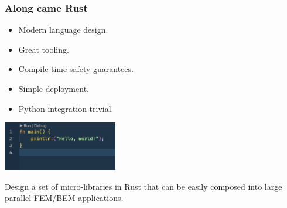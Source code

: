 \documentclass[dvipsnames,10pt]{beamer}
\begin{document}
\begin{frame}
\frametitle{Along came Rust}
\begin{minipage}{5cm}
\begin{itemize}
\item Modern language design.
\item Great tooling.
\item Compile time safety guarantees.
\item Simple deployment.
\item Python integration trivial.
\end{itemize}
\end{minipage}
\begin{minipage}{5cm}
\includegraphics[width=5cm]{../figs/rust_hello}
\end{minipage}

\vspace{2\baselineskip}

\begin{tcolorbox}
Design a set of micro-libraries in Rust that can be easily composed into large parallel FEM/BEM applications.
\end{tcolorbox}

\end{frame}
\end{document}
